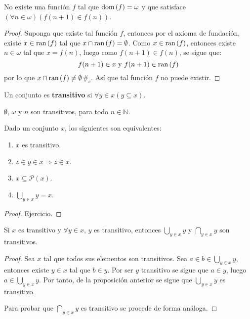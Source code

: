 \documentclass[12pt]{report}
\newcounter{it}
\theoremstyle{largebreak}
\newcommand\contradiction{\ensuremath{\#_c}}
\newcommand\pot[1]{\ensuremath{\mathcal{P}\left(#1\right)}}
\newcommand\dom[1]{\ensuremath{\textup{dom}\left(#1\right)}}
\newcommand\ran[1]{\ensuremath{\textup{ran}\left(#1\right)}}
\begin{document}
    \begin{propo}
        No existe una función $f$ tal que $\dom{f}=\omega$ y que satisface $(\forall n\in\omega)(f(n+1)\in f(n))$.
    \end{propo}

    \begin{proof}
        Suponga que existe tal función $f$, entonces por el axioma de fundación, existe $x\in\ran{f}$ tal que $x\cap\ran{f}=\emptyset$. Como $x\in\ran{f}$, entonces existe $n\in\omega$ tal que $x=f(n)$, luego como $f(n+1)\in f(n)$, se sigue que:
        \begin{equation*}
            f(n+1)\in x\textup{ y }f(n+1)\in\ran{f}
        \end{equation*}
        por lo que $x\cap\ran{f}\neq\emptyset$\contradiction. Así que tal función $f$ no puede existir.
    \end{proof}

    \begin{mydef}
        Un conjunto es \textbf{transitivo} si $\forall y\in x(y\subseteq x)$.
    \end{mydef}

    \begin{exa}
        $\emptyset$, $\omega$ y $n$ son transitivos, para todo $n\in\mathbb{N}$.
    \end{exa}

    \begin{propo}
        Dado un conjunto $x$, los siguientes son equivalentes:
        \begin{enumerate}[label = \textit{(\arabic*)}]
            \item $x$ es transitivo.
            \item $z\in y\in x \Rightarrow z\in x$.
            \item $x\subseteq\pot{x}$.
            \item $\bigcup_{y\in x}y=x$.
        \end{enumerate}
    \end{propo}

    \begin{proof}
        Ejercicio.
    \end{proof}

    \begin{lema}
        Si $x$ es transitivo y $\forall y\in x$, $y$ es transitivo, entonces $\bigcup_{ y\in x}y$ y $\bigcap_{ y\in x}y$ son transitivos.
    \end{lema}

    \begin{proof}
        Sea $x$ tal que todos sus elementos son transitivos. Sea $a\in b\in\bigcup_{ y\in x}y$, entonces existe $y\in x$ tal que $b\in y$. Por ser $y$ transitivo se sigue que $a\in y$, luego $a\in\bigcup_{ y\in x}y$. Por tanto, de la proposición anterior se sigue que $\bigcup_{ y\in x}y$ es transitivo.

        Para probar que $\bigcap_{y\in x}y$ es transitivo se procede de forma análoga.
    \end{proof}
\end{document}
